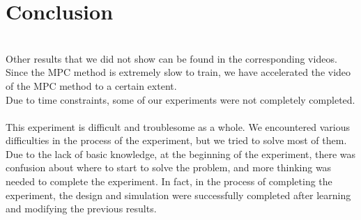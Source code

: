 \documentclass[12pt]{article}
\begin{document}
\section{Conclusion}
~\\\indent Other results that we did not show can be found in the corresponding videos. Since the MPC method is extremely slow to train, we have accelerated the video of the MPC method to a certain extent.
~\\\indent Due to time constraints, some of our experiments were not completely completed.
~\\\indent This experiment is difficult and troublesome as a whole. We encountered various difficulties in the process of the experiment, but we tried to solve most of them. Due to the lack of basic knowledge, at the beginning of the experiment, there was confusion about where to start to solve the problem, and more thinking was needed to complete the experiment. In fact, in the process of completing the experiment, the design and simulation were successfully completed after learning and modifying the previous results.
\end{document}
